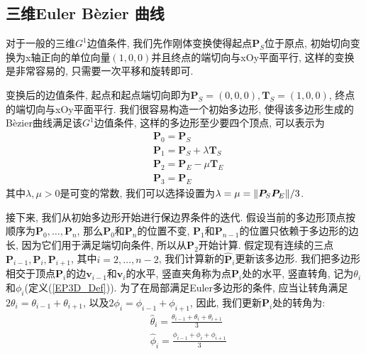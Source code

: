 \documentclass[utf8]{ctexart} %
\begin{document}
	 \subsection{三维Euler B\`{e}zier 曲线}
	 对于一般的三维$G^1$边值条件, 我们先作刚体变换使得起点$\boldsymbol{P}_S$位于原点, 初始切向变换为x轴正向的单位向量$(1,0,0)$并且终点的端切向与xOy平面平行, 这样的变换是非常容易的, 只需要一次平移和旋转即可. \par
	 变换后的边值条件, 起点和起点端切向即为$\boldsymbol{P}_S=(0,0,0), \boldsymbol{T}_S = (1,0,0)$, 终点的端切向与xOy平面平行. 我们很容易构造一个初始多边形, 使得该多边形生成的B\`ezier曲线满足该$G^1$边值条件, 这样的多边形至少要四个顶点, 可以表示为
	 \begin{equation}
	 	\begin{aligned}
	 		&\boldsymbol{P}_0 = \boldsymbol{P}_S\\
	 		&\boldsymbol{P}_1 = \boldsymbol{P}_S+\lambda\boldsymbol{T}_S\\
	 		&\boldsymbol{P}_2 = \boldsymbol{P}_E-\mu\boldsymbol{T}_E\\
	 		&\boldsymbol{P}_3 = \boldsymbol{P}_E
	 	\end{aligned}
	 \end{equation}
	 其中$\lambda, \mu>0$是可变的常数, 我们可以选择设置为$\lambda = \mu = \Arrowvert\boldsymbol{P}_S\boldsymbol{P}_E\Arrowvert/3$. \par 
	 接下来, 我们从初始多边形开始进行保边界条件的迭代. 假设当前的多边形顶点按顺序为$\boldsymbol{P}_0, \dots,\boldsymbol{P}_n$, 那么$\boldsymbol{P}_0$和$\boldsymbol{P}_n$的位置不变, $\boldsymbol{P}_1$和$\boldsymbol{P}_{n-1}$的位置只依赖于多边形的边长, 因为它们用于满足端切向条件, 所以从$\boldsymbol{P}_2$开始计算. 假定现有连续的三点$\boldsymbol{P}_{i-1},\boldsymbol{P}_i,\boldsymbol{P}_{i+1}$, 其中$i=2,\dots,n-2$, 我们计算新的$\hat{\boldsymbol{P}}_i$更新该多边形. 我们把多边形相交于顶点$\boldsymbol{P}_i$的边$\boldsymbol{v}_{i-1}$和$\boldsymbol{v}_{i}$的水平, 竖直夹角称为点$\boldsymbol{P}_i$处的水平, 竖直转角, 记为$\theta_i$和$\phi_i$(定义(\ref{EP3D_Def})). 为了在局部满足Euler多边形的条件, 应当让转角满足$2\theta_i = \theta_{i-1}+\theta_{i+1}$, 以及$2\phi_{i} = \phi_{i-1}+\phi_{i+1}$, 因此, 我们更新$\boldsymbol{P}_i$处的转角为:
	 \begin{equation}\label{new_theta}
	 	\begin{aligned}
	 		&\hat{\theta}_i = \frac{\theta_{i-1}+\theta_i+\theta_{i+1}}3\\
	 		&\hat{\phi}_i =
	 		\frac{\phi_{i-1}+\phi_i+\phi_{i+1}}3
	 	\end{aligned}
	 \end{equation}
\end{document}
